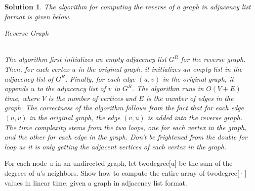 \documentclass[boxes]{rutgers_hw}
\newtheorem*{solutions}{Solution}
\begin{document}
    \begin{solutions}
        The algorithm for computing the reverse of a graph in adjacency list format is given below.
        \begin{algorithm}
            \caption{Reverse Graph}
            \begin{algorithmic}[1]
                    \EndFor{}
                        \EndFor{}
                    \EndFor{}
                \EndFunction{}
            \end{algorithmic}
        \end{algorithm} \\
        The algorithm first initializes an empty adjacency list $G^R$ for the reverse graph. Then, for each vertex $u$ in the original graph, it initializes an empty list in the adjacency list of $G^R$. Finally, for each edge $(u, v)$ in the original graph, it appends $u$ to the adjacency list of $v$ in $G^R$. The algorithm runs in $O(V + E)$ time, where $V$ is the number of vertices and $E$ is the number of edges in the graph.
        The correctness of the algorithm follows from the fact that for each edge $(u, v)$ in the original graph, the edge $(v, u)$ is added into the reverse graph.
        The time complexity stems from the two loops, one for each vertex in the graph, and the other for each edge in the graph. Don't be frightened from the double for loop as it is only getting the adjacent vertices of each vertex in the graph.
    \end{solutions}

    \pagebreak

    \begin{exern}{3.9}
        For each node u in an undirected graph, let twodegree[u] be the sum of the degrees of u’s neighbors. Show how to compute the entire array of twodegree[·] values in linear time, given a graph in adjacency list format.
    \end{exern}
\end{document}
